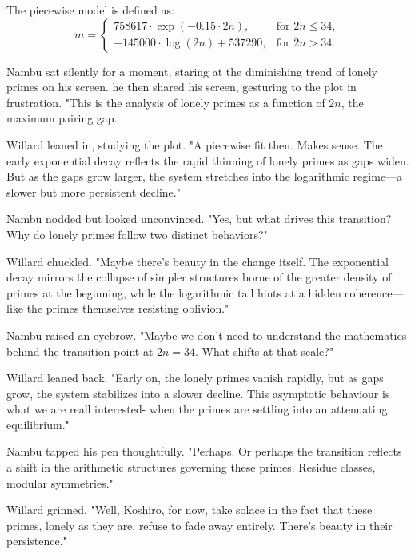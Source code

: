 The piecewise model is defined as:
\[
m =
\begin{cases} 
758617 \cdot \exp(-0.15 \cdot 2n), & \text{for } 2n \leq 34, \\
-145000 \cdot \log(2n) + 537290, & \text{for } 2n > 34.
\end{cases}
\]

Nambu sat silently for a moment, staring at the diminishing trend of lonely primes on his screen. he then shared his screen, gesturing to the plot in frustration. "This is the analysis of lonely primes as a function of \(2n\), the maximum pairing gap.


Willard leaned in, studying the plot. "A piecewise fit then. Makes sense. The early exponential decay reflects the rapid thinning of lonely primes as gaps widen. But as the gaps grow larger, the system stretches into the logarithmic regime—a slower but more persistent decline."

\bigskip

Nambu nodded but looked unconvinced. "Yes, but what drives this transition? Why do lonely primes follow two distinct behaviors?"
\bigskip

Willard chuckled. "Maybe there’s beauty in the change itself. The exponential decay mirrors the collapse of simpler structures borne of the greater density of primes at the beginning, while the logarithmic tail hints at a hidden coherence—like the primes themselves resisting oblivion."
\bigskip

Nambu raised an eyebrow. "Maybe we don't need to understand the mathematics behind the transition point at \(2n = 34\). What shifts at that scale?"


Willard leaned back. "Early on, the lonely primes vanish rapidly, but as gaps grow, the system stabilizes into a slower decline. This asymptotic behaviour is what we are reall interested- when the primes are settling into an attenuating equilibrium."
\bigskip

Nambu tapped his pen thoughtfully. "Perhaps. Or perhaps the transition reflects a shift in the arithmetic structures governing these primes. Residue classes, modular symmetries."
\bigskip

Willard grinned. "Well, Koshiro, for now, take solace in the fact that these primes, lonely as they are, refuse to fade away entirely. There’s beauty in their persistence."
\bigskip

